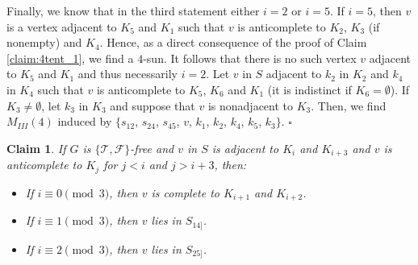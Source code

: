 \documentclass[12pt]{book}
\theoremstyle{plain}
\newtheorem{claim}[teo]{Claim}
\theoremstyle{remark}
\newcommand*{\QED}{\hfill\ensuremath{\square}}%
\begin{document}
\vspace{1mm}
Finally, we know that in the third statement either $i=2$ or $i=5$.
If $i=5$, then $v$ is a vertex adjacent to $K_5$ and $K_1$ such that $v$ is anticomplete to $K_2$, $K_3$ (if nonempty) and $K_4$. Hence, as a direct consequence of the proof of Claim \ref{claim:4tent_1}, we find a $4$-sun. It follows that there is no such vertex $v$ adjacent to $K_5$ and $K_1$ and thus necessarily $i=2$. 
Let $v$ in $S$ adjacent to $k_2$ in $K_2$ and $k_4$ in $K_4$ such that $v$ is anticomplete to $K_5$, $K_6$ and $K_1$ (it is indistinct if $K_6 = \emptyset$).
If $K_3 \neq \emptyset$, let $k_3$ in $K_3$ and suppose that $v$ is nonadjacent to $K_3$. Then, we find $M_{III}(4)$ induced by $\{s_{12}$, $s_{24}$, $s_{45}$, $v$, $k_1$, $k_2$, $k_4$, $k_5$, $k_3\}$. \QED



\begin{claim} \label{claim:4tent_3}
	If $G$ is $\{ \mathcal{T}, \mathcal{F} \}$-free and $v$ in $S$ is adjacent to $K_i$ and $K_{i+3}$ and $v$ is anticomplete to $K_j$ for $j < i$ and $j>i+3$, then:
	\begin{itemize}
		\item If $i \equiv 0 \pmod{3}$, then $v$ is complete to $K_{i+1}$ and $K_{i+2}$.
		\item If $i \equiv 1 \pmod 3$, then $v$ lies in $S_{14]}$.
		\item If $i \equiv 2 \pmod{3}$, then $v$ lies in $S_{25] }$.
	\end{itemize}
\end{claim}
\end{document}
